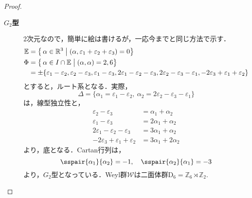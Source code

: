 \documentclass[rep_main]{subfiles}
\begin{document}
\begin{proof}
\begin{description}
		\item[\textbf{$G_2$型}] 
		2次元なので，簡単に絵は書けるが，一応今までと同じ方法で示す．
		\begin{align}
			\mathbb{E} &= \bigl\{\, \alpha \in \mathbb{R}^3 \bigm| (\alpha, \varepsilon_1 + \varepsilon_2 + \varepsilon_3) = 0\bigr\}\\
			\Phi &= \bigl\{\, \alpha \in I \cap \mathbb{E} \bigm| (\alpha, \alpha) = 2, 6\bigr\}\\
			&= \pm\{\varepsilon_1 - \varepsilon_2, \varepsilon_2 - \varepsilon_3, \varepsilon_1 - \varepsilon_3, 2\varepsilon_1 - \varepsilon_2 - \varepsilon_3, 2\varepsilon_2 - \varepsilon_3 - \varepsilon_1, -2\varepsilon_3 + \varepsilon_1 + \varepsilon_2\}
		\end{align}
		とすると，ルート系となる．実際，
		\begin{equation}
			\Delta = \bigl\{\alpha_1 = \varepsilon_1 - \varepsilon_2,\ \alpha_2 = 2\varepsilon_2 - \varepsilon_3 - \varepsilon_1\bigr\}
		\end{equation}	
		は，線型独立性と，
		\begin{align}
			\varepsilon_2 - \varepsilon_3 &= \alpha_1 + \alpha_2 \\
			\varepsilon_1 - \varepsilon_3 &= 2\alpha_1 + \alpha_2 \\
			2\varepsilon_1 - \varepsilon_2 - \varepsilon_3 &= 3\alpha_1 + \alpha_2 \\
			-2\varepsilon_3 + \varepsilon_1 + \varepsilon_2 &= 3\alpha_1 + 2\alpha_2
		\end{align}
		より，底となる．Cartan行列は，
		\begin{equation}
			\sspair{\alpha_1}{\alpha_2} = -1,\quad  \sspair{\alpha_2}{\alpha_1} = -3
		\end{equation}
		より，$G_2$型となっている．Weyl群$\mathscr{W}$は二面体群$\mathrm{D}_6 = \mathbb{Z}_6 \rtimes \mathbb{Z}_2$. 
	\end{description}
\end{proof}
\end{document}
